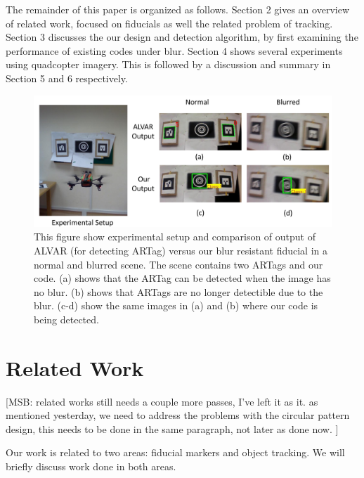 \documentclass[runningheads]{llncs}
\begin{document}
The remainder of this paper is organized as follows.   Section 2 gives an
overview of related work, focused on fiducials as well the related problem of
tracking.  Section 3 discusses the our design and detection algorithm, by first
examining the performance of existing codes under blur. Section 4 shows several
experiments using quadcopter imagery.  This is followed by a discussion and
summary in Section 5 and 6 respectively.

\begin{figure}
\includegraphics[width=\linewidth]{teaser.pdf}
\caption{This figure show experimental setup and comparison of
output of ALVAR\cite{alvar} (for detecting ARTag) versus our blur resistant fiducial
in a normal and blurred scene. The scene contains two ARTags and our code.
(a) shows that the ARTag can be detected when the image has no blur. 
(b) shows that ARTags are no longer detectible due to the blur.
(c-d) show the same images in (a) and (b) where our code is being detected.}
\label{fig:teaser}
\end{figure}

\section{Related Work}

[MSB: related works still needs a couple more passes, I've left it as it.
as mentioned yesterday, we need to address the problems with the circular 
pattern design, this needs to be done in the same paragraph, not later as done now. ]

Our work is related to two areas: fiducial markers and
object tracking. We will briefly discuss work done in both areas.
\end{document}
